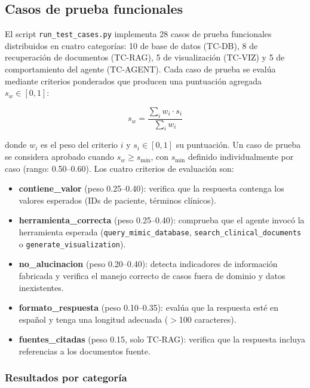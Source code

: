 \subsection{Casos de prueba funcionales}
\label{sec:eval_funcional}

El script \texttt{run\_test\_cases.py} implementa 28 casos de prueba
funcionales distribuidos en cuatro categorías: 10 de base de datos (TC-DB),
8 de recuperación de documentos (TC-RAG), 5 de visualización (TC-VIZ) y
5 de comportamiento del agente (TC-AGENT). Cada caso de prueba se evalúa
mediante criterios ponderados que producen una puntuación agregada
$s_w \in [0, 1]$:

\begin{equation}
s_w = \frac{\displaystyle\sum_{i} w_i \cdot s_i}{\displaystyle\sum_{i} w_i}
\label{eq:weighted_score}
\end{equation}

donde $w_i$ es el peso del criterio $i$ y $s_i \in [0, 1]$ su puntuación.
Un caso de prueba se considera aprobado cuando $s_w \geq s_{\min}$, con
$s_{\min}$ definido individualmente por caso (rango: 0.50--0.60).
Los cuatro criterios de evaluación son:

\begin{itemize}[nosep, leftmargin=*]
  \item \textbf{contiene\_valor} (peso 0.25--0.40): verifica que la respuesta
    contenga los valores esperados (IDs de paciente, términos clínicos).
  \item \textbf{herramienta\_correcta} (peso 0.25--0.40): comprueba que el
    agente invocó la herramienta esperada (\texttt{query\_mimic\_database},
    \texttt{search\_clinical\_documents} o \texttt{generate\_visualization}).
  \item \textbf{no\_alucinacion} (peso 0.20--0.40): detecta indicadores de
    información fabricada y verifica el manejo correcto de casos fuera de
    dominio y datos inexistentes.
  \item \textbf{formato\_respuesta} (peso 0.10--0.35): evalúa que la respuesta
    esté en español y tenga una longitud adecuada ($>$100 caracteres).
  \item \textbf{fuentes\_citadas} (peso 0.15, solo TC-RAG): verifica que la
    respuesta incluya referencias a los documentos fuente.
\end{itemize}

\subsubsection{Resultados por categoría}
\label{sec:tc_resultados}

